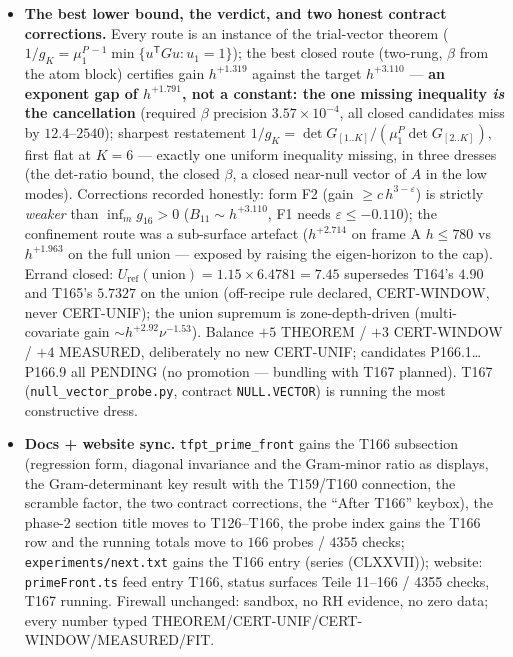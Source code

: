 \documentclass[11pt]{article}
\begin{document}
\begin{itemize}[leftmargin=1.5em]
{in the $2\times2$ Gram determinant} --- the polarisation split
$\det(G_{\mathrm{ar}}+G_{\mathrm{at}})=\det G_{\mathrm{ar}}+\det
G_{\mathrm{at}}+\Pi$ (exact to $6.7\times10^{-14}$) has pieces $2.6$--$630$
cancelling to $1.0\times10^{-3}$--$1.7\times10^{-2}$, a ratio
$2.6\times10^{-6}$--$5.1\times10^{-4}\sim h^{-1.45}$ --- the same
arch-against-atom mechanism as T159/T160, one level up, in a quadratic
functional of the lag sums. Pinned to the arithmetic twice: the $L_P$ no-go
breaks completely (gain $\equiv1.0000000000$ exactly), and the anti-fitting
scramble (uniform random atom positions, same total mass) destroys the
effect by a factor $4569$.
\item \textbf{The best lower bound, the verdict, and two honest contract
corrections.} Every route is an instance of the trial-vector theorem
($1/g_K=\mu_1^{P\,-1}\min\{u^{\mathsf T}Gu:u_1=1\}$); the best closed route
(two-rung, $\beta$ from the atom block) certifies gain $h^{+1.319}$ against
the target $h^{+3.110}$ --- \textbf{an exponent gap of $h^{+1.791}$, not a
constant: the one missing inequality \emph{is} the cancellation} (required
$\beta$ precision $3.57\times10^{-4}$, all closed candidates miss by
$12.4$--$2540$); sharpest restatement
$1/g_K=\det G_{[1..K]}/(\mu^P_1\det G_{[2..K]})$, first flat at $K=6$ ---
exactly one uniform inequality missing, in three dresses (the det-ratio
bound, the closed $\beta$, a closed near-null vector of $A$ in the low
modes). Corrections recorded honestly: form F2 (gain
$\ge c\,h^{3-\varepsilon}$) is strictly \emph{weaker} than
$\inf_m g_{16}>0$ ($B_{11}\sim h^{+3.110}$, F1 needs
$\varepsilon\le-0.110$); the confinement route was a sub-surface artefact
($h^{+2.714}$ on frame A $h\le780$ vs $h^{+1.963}$ on the full union ---
exposed by raising the eigen-horizon to the cap). Errand closed:
$U_{\mathrm{ref}}(\text{union})=1.15\times6.4781=7.45$ supersedes T164's
$4.90$ and T165's $5.7327$ on the union (off-recipe rule declared,
CERT-WINDOW, never CERT-UNIF); the union supremum is zone-depth-driven
(multi-covariate gain $\sim h^{+2.92}\nu^{-1.53}$). Balance $+5$ THEOREM /
$+3$ CERT-WINDOW / $+4$ MEASURED, deliberately no new CERT-UNIF; candidates
P166.1\ldots P166.9 all PENDING (no promotion --- bundling with T167
planned). T167 (\texttt{null\_vector\_probe.py}, contract
\texttt{NULL.VECTOR}) is running the most constructive dress.
\item \textbf{Docs + website sync.} \texttt{tfpt\_prime\_front} gains the T166
subsection (regression form, diagonal invariance and the Gram-minor ratio as
displays, the Gram-determinant key result with the T159/T160 connection, the
scramble factor, the two contract corrections, the ``After T166'' keybox),
the phase-2 section title moves to T126--T166, the probe index gains the
T166 row and the running totals move to $166$ probes / $4355$ checks;
\texttt{experiments/next.txt} gains the T166 entry (series (CLXXVII));
website: \texttt{primeFront.ts} feed entry T166, status surfaces
Teile 11--166 / 4355 checks, T167 running. Firewall unchanged: sandbox, no
RH evidence, no zero data; every number typed
THEOREM/CERT-UNIF/CERT-WINDOW/MEASURED/FIT.
\end{itemize}
\end{document}
